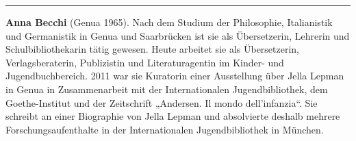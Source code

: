 \begin{center}\rule{3in}{0.4pt}\end{center}

\textbf{Anna Becchi} (Genua 1965). Nach dem Studium der Philosophie,
Italianistik und Germanistik in Genua und Saarbrücken ist sie als
Übersetzerin, Lehrerin und Schulbibliothekarin tätig gewesen. Heute
arbeitet sie als Übersetzerin, Verlagsberaterin, Publizistin und
Literaturagentin im Kinder- und Jugendbuchbereich. 2011 war sie
Kuratorin einer Ausstellung über Jella Lepman in Genua in Zusammenarbeit
mit der Internationalen Jugendbibliothek, dem Goethe-Institut und der
Zeitschrift „Andersen. Il mondo dell'infanzia``. Sie schreibt an einer
Biographie von Jella Lepman und absolvierte deshalb mehrere
Forschungsaufenthalte in der Internationalen Jugendbibliothek in
München.
